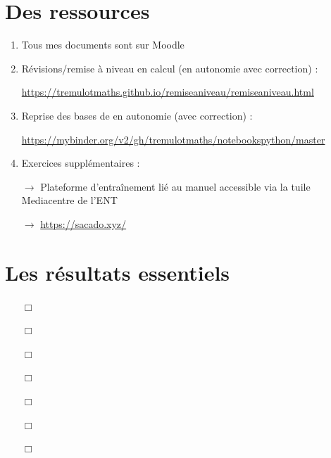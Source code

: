 \documentclass[12pt,oneside]{report}
\begin{document}
\begin{spacing}{1.2}
\section*{Des ressources}

\begin{enumerate}
\item Tous mes documents sont sur Moodle

\item Révisions/remise à niveau en calcul (en autonomie avec correction) : 

\url{https://tremulotmaths.github.io/remiseaniveau/remiseaniveau.html}

\item Reprise des bases de \python en autonomie (avec correction) :

\url{https://mybinder.org/v2/gh/tremulotmaths/notebookspython/master}

\item Exercices supplémentaires :

$\longrightarrow$ Plateforme d'entraînement lié au manuel accessible via la \og tuile \fg{} Mediacentre de l'ENT

$\longrightarrow$ \url{https://sacado.xyz/}

\end{enumerate}


\section*{Les résultats essentiels}

\begin{itemize}
\item[$\Box$] 

\item[$\Box$] 

\item[$\Box$] 

\item[$\Box$] 

\item[$\Box$] 

\item[$\Box$] 

\item[$\Box$] 


\end{itemize}
\end{spacing}
\end{document}
